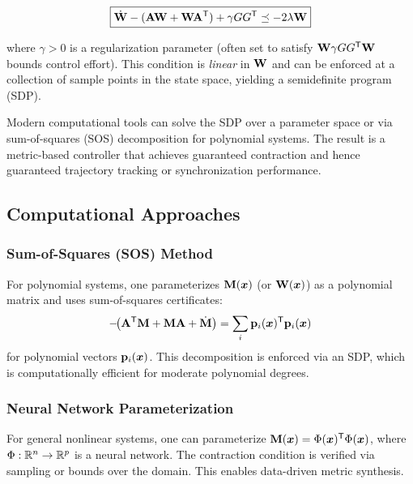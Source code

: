 \begin{equation}
\boxed{
\dot{\mathbf{W}} - (\mathbf{A}\mathbf{W} + \mathbf{W}\mathbf{A}^{\mathsf{T}}) + \gamma G G^{\mathsf{T}} \preceq -2\lambda\mathbf{W}
}
\label{eq:ch4:pointwise-LMI}
\end{equation}

where $\gamma > 0$ is a regularization parameter (often set to satisfy $\mathbf{W}\gamma G G^{\mathsf{T}} \mathbf{W}$ bounds
control effort). This condition is \emph{linear} in $\mathbf{W}$ and can be enforced at a collection
of sample points in the state space, yielding a semidefinite program (SDP).

\begin{designbox}
Modern computational tools can solve the SDP over a parameter space or via sum-of-squares
(SOS) decomposition for polynomial systems. The result is a metric-based controller that
achieves guaranteed contraction and hence guaranteed trajectory tracking or synchronization
performance.
\end{designbox}

\subsection{Computational Approaches}

\subsubsection{Sum-of-Squares (SOS) Method}

For polynomial systems, one parameterizes $\mathbf{M}(\bm{x})$ (or $\mathbf{W}(\bm{x})$) as a polynomial
matrix and uses sum-of-squares certificates:
\begin{equation}
-\!\bigl(\mathbf{A}^{\mathsf{T}}\mathbf{M} + \mathbf{M}\mathbf{A} + \dot{\mathbf{M}}\bigr) = \sum_{i} \mathbf{p}_i(\bm{x})^{\mathsf{T}} \mathbf{p}_i(\bm{x})
\end{equation}
for polynomial vectors $\mathbf{p}_i(\bm{x})$. This decomposition is enforced via an SDP, which
is computationally efficient for moderate polynomial degrees.

\subsubsection{Neural Network Parameterization}

For general nonlinear systems, one can parameterize $\mathbf{M}(\bm{x}) = \Phi(\bm{x})^{\mathsf{T}} \Phi(\bm{x})$,
where $\Phi: \mathbb{R}^n \to \mathbb{R}^{p}$ is a neural network. The contraction condition is verified
via sampling or bounds over the domain. This enables data-driven metric synthesis.

